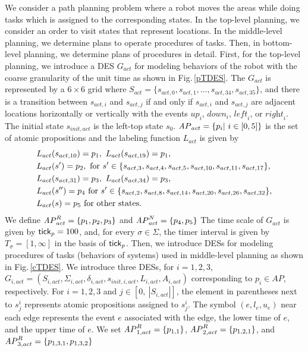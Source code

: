 \documentclass{article}
\newcommand{\rfig}[1]{Fig.\,\ref{#1}}
\newcommand{\tick}{{\sf tick}}
\newcommand{\AP}{{\textit AP}}
\begin{document}
We consider a path planning problem where a robot moves the areas while doing tasks which is assigned to the corresponding states.
In the top-level planning, we consider an order to visit states that represent locations.
In the middle-level planning, we determine plans to operate procedures of tasks. 
Then, in bottom-level planning, we determine plans of procedures in detail.
%
%
First, for the top-level planning, we introduce a DES $G_{act}$ for modeling behaviors of the robot 
 with the coarse granularity of the unit time as shown in \rfig{pTDES}.
%
The $G_{act}$ is represented by a $6\times6$ grid where $S_{act}=\{s_{act,0},s_{act,1},\ldots,s_{act,{34}},s_{act,{35}}\}$, and there is a transition between $s_{act,i}$ and $s_{act,j}$ if and only if $s_{act,i}$ and $s_{act,j}$ are adjacent locations horizontally or vertically with the events $\textit{up}_i$, $\textit{down}_i$, $\textit{left}_i$, or $\textit{right}_i$.
%
The initial state $s_{init,act}$ is the left-top state $s_0$.
$\AP_{act}=\{p_i|~i\in[0,5]\}$ is the set of atomic propositions and the labeling function $L_{act}$ is given by
\begin{align}
&L_{act}(s_{act, 10 }) =  p_1,\
L_{act}(s_{act,19}) =  p_1, \notag \\
&L_{act}(s') = p_2,\mbox{ for } s'\in\{s_{act,3},s_{act,4},s_{act,5},s_{act,10},s_{act,11},s_{act,17}\}, \notag\\
&L_{act}(s_{act, 31 }) = p_3,\ 
L_{act}(s_{act, 34 }) =  p_3, \notag\\
&L_{act}(s'') =  p_4\mbox{ for } s'\in\{s_{act,2},s_{act,8},s_{act,14},s_{act,20},s_{act,26},s_{act,32}\},\notag\\
&L_{act}(s) =  p_5\mbox{ for other states.}
\end{align}
We define $\AP_{act}^R=\{p_1,p_2,p_3\}$ and $\AP_{act}^N=\{p_4,p_5\}$ 
The time scale of $G_{act}$ is given by ${\tick}_p=100$, and, for every $\sigma\in \Sigma$, the timer interval is given by $T_\sigma=[1,\infty]$ in the basis of ${\tick}_p$.
%
%
Then, we introduce DESs for modeling procedures of tasks (behaviors of systems) used in middle-level planning as shown in \rfig{cTDES}.
We introduce three DESs, for $i=1,2,3$, $G_{i,act}=(S_{i,act}, \Sigma_{i,act}, \delta_{i,act},s_{init,i,act}, L_{i,act}, A_{i,act})$ corresponding to $p_i\in \textit{AP}$, respectively.
For $i=1,2,3$ and $j\in[0,\ |S_{i,act}|]$, the element in parentheses next to $s_j^i$ represents atomic propositions assigned to $s_j^i$.
%
The symbol $(e,l_e,u_e)$ near each edge represents the event  $e$ associated with the edge, the lower time of $e$, and the upper time of $e$.
We set $\AP_{1,act}^R=\{p_{1,1}\}$, $\AP_{2,act}^R=\{p_{1,2,1}\}$, and $\AP_{3,act}^R=\{p_{1,3,1},p_{1,3,2}\}$
%
\end{document}
